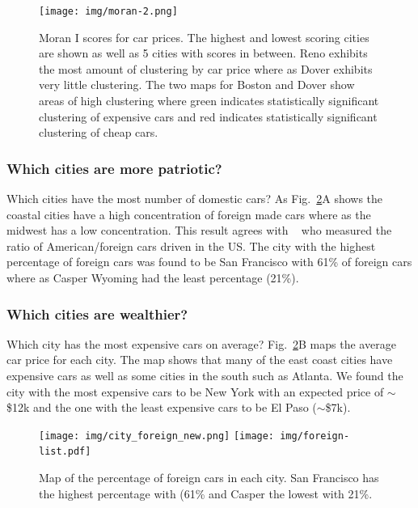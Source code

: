\documentclass[10pt,twocolumn,letterpaper]{article}
\begin{document}
\begin{figure}[t]
\begin{center}
    \texttt{[image: img/moran-2.png]}
\end{center}
   \caption {Moran I scores for car prices. The highest and lowest scoring cities are shown as well as 5 cities with scores in between. Reno exhibits the most amount of clustering by car price where as Dover exhibits very little clustering. The two maps for Boston and Dover show areas of high clustering where green indicates statistically significant clustering of expensive cars and red indicates statistically significant clustering of cheap cars.} 
\label{fig:moran-i}
\end{figure}

\subsubsection{Which cities are more patriotic?}
Which cities have the most number of domestic cars? As Fig.~\ref{fig:city_price}A shows the coastal cities have a high concentration of foreign made cars where as the midwest has a low concentration. This result agrees with ~\cite{foreign_domestic} who measured the ratio of American/foreign cars driven in the US. The city with the highest percentage of foreign cars was found to be San Francisco with 61\% of foreign cars where as Casper Wyoming had the least percentage (21\%).

\subsubsection{Which cities are wealthier?}
Which city has the most expensive cars on average? Fig.~\ref{fig:city_price}B maps the average car price for each city. The map shows that many of the east coast cities have expensive cars as well as some cities in the south such as Atlanta. We found the city with the most expensive cars to be New York with an expected price of \(\sim\)\$12k and the one with the least expensive cars to be El Paso (\(\sim\)\$7k). 

\begin{figure}[t]
\begin{center}
    \texttt{[image: img/city\_foreign\_new.png]}
    \texttt{[image: img/foreign-list.pdf]}
\end{center}
   \caption {Map of the percentage of foreign cars in each city. San Francisco has the highest percentage with (61\% and Casper the lowest with 21\%.} 
\label{fig:city_price}
\end{figure}
\end{document}
